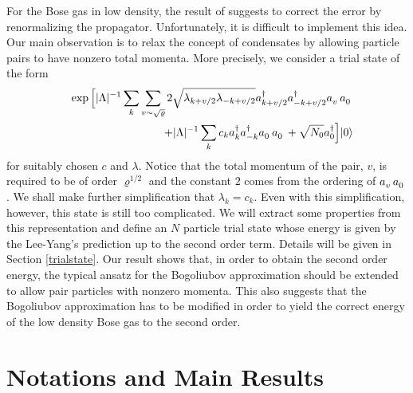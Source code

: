 \documentclass[11pt]{article}
\numberwithin{equation}{section}
\newcommand{\ann}{a^{\hphantom{+}}}
\newcommand{\cre}{a^{\dagger}}
\newcommand{\beqa}{\begin{eqnarray}}
\newcommand{\eeqa}{\end{eqnarray}}
\renewcommand\rho\varrho
\theoremstyle{definition}
\begin{document}
For the Bose gas in low density, the result of \cite{ESY} suggests to correct the error by 
renormalizing the propagator.  Unfortunately,  it is difficult to implement this idea. 
Our main observation is to relax the concept of condensates 
by allowing particle pairs to have nonzero total momenta. More precisely, we consider a trial state of the form 
\beqa\label{trialstate00}
&& \exp \Big  [ |\Lambda|^{-1}  \sum_k \sum_{v \sim \sqrt \rho }  2 \sqrt { \lambda_{k+v/2}  \lambda_{-k+v/2}} \cre_{k+v/2}\cre_{-k+v/2}\ann_v\ann_0   \nonumber \\ 
&& +  |\Lambda|^{-1}  \sum_k  {c_k}  \cre_k\cre_{-k}\ann_0\ann_0  +  \sqrt{N_0}\cre_0  \Big  ] |0\rangle
\eeqa
for suitably chosen $c$ and $\lambda$. 
Notice that the total momentum of the pair, $v$, is required to be of  order $\rho^{1/2}$ and the constant $2$ comes from the ordering of 
$\ann_v \ann_0$. We shall make further simplification that $\lambda_k = c_k$. Even with this simplification, 
however,  
this state  is still too complicated. We will extract some properties from this representation and define an 
$N$ particle trial state whose energy is given by the Lee-Yang's prediction up to the second order term.  Details will be given in Section \ref{trialstate}.  Our result shows that, in order to obtain the second order energy,  the typical ansatz for the Bogoliubov approximation should be extended to allow pair particles with nonzero  momenta. This also suggests that the Bogoliubov approximation has to be  modified in order to yield the correct energy of the low density  Bose gas to the second order. 

 
\section{Notations  and Main Results}
\end{document}
